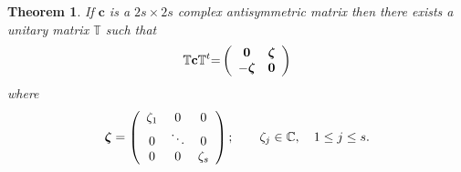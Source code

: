 \documentclass[preprint,aps,showkeys]{revtex4}%
\newtheorem{theorem}{Theorem}
\begin{document}
\begin{theorem}
If $\mathbf{c}$ is a $2s\times2s$ complex antisymmetric matrix then there
exists a unitary matrix $\mathbb{T}$ such that
\begin{equation}
\mathbb{T}\mathbf{c}\mathbb{T}^{t}\mathbb{=}\left(
\begin{array}
[c]{cc}%
\mathbf{0} & \boldsymbol{\zeta}\\
-\boldsymbol{\zeta} & \mathbf{0}%
\end{array}
\right)
\end{equation}
where
\begin{equation}
\boldsymbol{\zeta}=\left(
\begin{array}
[c]{ccc}%
\zeta_{1} & 0 & 0\\
0 & \ddots & 0\\
0 & 0 & \zeta_{s}%
\end{array}
\right)  ;\qquad\zeta_{j}\in\mathbb{C},\quad1\leq j\leq s.
\end{equation}



\end{theorem}
\end{document}
